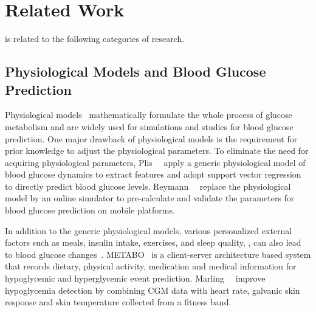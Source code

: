 \section{Related Work}
\label{sec:relwork}
\sysname is related to the following categories of research.

\subsection{Physiological Models and Blood Glucose Prediction}
Physiological models~\cite{bib:TBE07:Dalla} \cite{bib:PE04:Hovorka} mathematically formulate the whole process of glucose metabolism and are widely used for simulations and studies for blood glucose prediction.
One major drawback of physiological models is the requirement for prior knowledge to adjust the physiological parameters.
To eliminate the need for acquiring physiological parameters, Plis~\etal~\cite{bib:MAIHA14:Plis} apply a generic physiological model of blood glucose dynamics to extract features and adopt support vector regression to directly predict blood glucose levels.
Reymann~\etal~\cite{bib:EMBC16:Reymann} replace the physiological model by an online simulator to pre-calculate and validate the parameters for blood glucose prediction on mobile platforms.

In addition to the generic physiological models, various personalized external factors such as meals, insulin intake, exercises, and sleep quality, \etc, can also lead to blood glucose changes~\cite{bib:DRCP15:Iwasaki}.
METABO~\cite{bib:EMBC09:Georga} is a client-server architecture based system that records dietary, physical activity, medication and medical information for hypoglycemic and hyperglycemic event prediction.
Marling~\etal~\cite{bib:KDHealth16:Marling} improve hypoglycemia detection by combining CGM data with heart rate, galvanic skin response and skin temperature collected from a fitness band.



